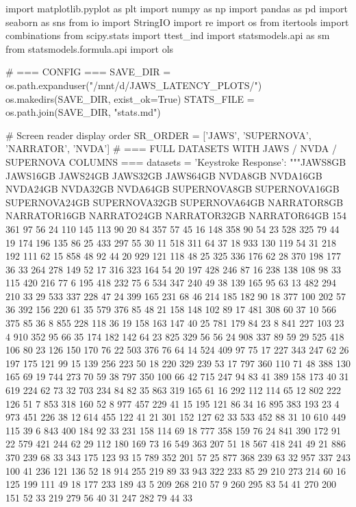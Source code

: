 \begin{pyverbatim}
	import matplotlib.pyplot as plt
	import numpy as np
	import pandas as pd
	import seaborn as sns
	from io import StringIO
	import re
	import os
	from itertools import combinations
	from scipy.stats import ttest_ind
	import statsmodels.api as sm
	from statsmodels.formula.api import ols

	# === CONFIG ===
	SAVE_DIR = os.path.expanduser("/mnt/d/JAWS_LATENCY_PLOTS/")
	os.makedirs(SAVE_DIR, exist_ok=True)
	STATS_FILE = os.path.join(SAVE_DIR, "stats.md")

	# Screen reader display order
	SR_ORDER = ['JAWS', 'SUPERNOVA', 'NARRATOR', 'NVDA']
	# === FULL DATASETS WITH JAWS / NVDA / SUPERNOVA COLUMNS ===
	datasets = {
	'Keystroke Response': """JAWS8GB	JAWS16GB	JAWS24GB	JAWS32GB	JAWS64GB	NVDA8GB	NVDA16GB	NVDA24GB	NVDA32GB	NVDA64GB	SUPERNOVA8GB	SUPERNOVA16GB	SUPERNOVA24GB	SUPERNOVA32GB	SUPERNOVA64GB	NARRATOR8GB	NARRATOR16GB	NARRATO24GB	NARRATOR32GB	NARRATOR64GB
	154	361	97	56	24	110	145	113	90	20	84	357	57	45	16	148	358	90	54	23
	528	325	79	44	19	174	196	135	86	25	433	297	55	30	11	518	311	64	37	18
	933	130	119	54	31	218	192	111	62	15	858	48	92	44	20	929	121	118	48	25
	325	336	176	62	28	370	198	177	36	33	264	278	149	52	17	316	323	164	54	20
	197	428	246	87	16	238	138	108	98	33	115	420	216	77	6	195	418	232	75	6
	534	347	240	49	38	139	165	95	63	13	482	294	210	33	29	533	337	228	47	24
	399	165	231	68	46	214	185	182	90	18	377	100	202	57	36	392	156	220	61	35
	579	376	85	48	21	158	148	102	89	17	481	308	60	37	10	566	375	85	36	8
	855	228	118	36	19	158	163	147	40	25	781	179	84	23	8	841	227	103	23	4
	910	352	95	66	35	174	182	142	64	23	825	329	56	56	24	908	337	89	59	29
	525	418	106	80	23	126	150	170	76	22	503	376	76	64	14	524	409	97	75	17
	227	343	247	62	26	197	175	121	99	15	139	256	223	50	18	220	329	239	53	17
	797	360	110	71	48	388	130	165	69	19	744	273	70	59	38	797	350	100	66	42
	715	247	94	83	41	389	158	173	40	31	619	224	62	73	32	703	234	84	82	35
	863	319	165	61	16	292	112	114	65	12	802	222	126	51	7	853	318	160	52	8
	977	457	229	41	15	195	121	86	34	16	895	383	193	23	4	973	451	226	38	12
	614	455	122	41	21	301	152	127	62	33	533	452	88	31	10	610	449	115	39	6
	843	400	184	92	33	231	158	114	69	18	777	358	159	76	24	841	390	172	91	22
	579	421	244	62	29	112	180	169	73	16	549	363	207	51	18	567	418	241	49	21
	886	370	239	68	33	343	175	123	93	15	789	352	201	57	25	877	368	239	63	32
	957	337	243	100	41	236	121	136	52	18	914	255	219	89	33	943	322	233	85	29
	210	273	214	60	16	125	199	111	49	18	177	233	189	43	5	209	268	210	57	9
	260	295	83	54	41	270	200	151	52	33	219	279	56	40	31	247	282	79	44	33
}
\end{pyverbatim}
